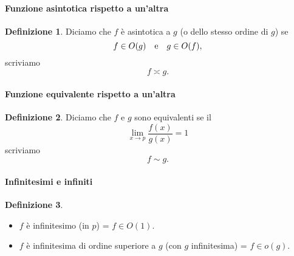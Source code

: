 \documentclass{article}
\theoremstyle{plain}
\theoremstyle{definition}
\newtheorem{defn}{Definizione}[section]
\theoremstyle{remark}
\begin{document}
\vspace{10pt}

\paragraph{Funzione asintotica rispetto a un'altra}
\begin{bxthm}
\begin{defn}
    Diciamo che $f$ è asintotica a $g$ (o dello stesso ordine di $g$) se \[f\in O(g)\quad\textup{e}\quad g\in O(f),\]
    scriviamo \[f\asymp g.\]
\end{defn}
\end{bxthm}

\vspace{10pt}

\paragraph{Funzione equivalente rispetto a un'altra}
\begin{bxthm}
\begin{defn}
    Diciamo che $f$ e $g$ sono equivalenti se il \[\lim_{x\to p}\frac{f(x)}{g(x)}=1\] scriviamo \[f\sim  g.\]
\end{defn}
\end{bxthm}

\vspace{10pt}

\paragraph{Infinitesimi e infiniti}
\begin{bxthm}
\begin{defn}\hfill
    \begin{itemize}
        \item $f$ è infinitesimo (in $p$) = $f\in O(1).$
        \item $f$ è infinitesima di ordine superiore a $g$ (con $g$ infinitesima) = $f\in o(g).$
    \end{itemize}
\end{defn}
\end{bxthm}

\vspace{10pt}
\end{document}
